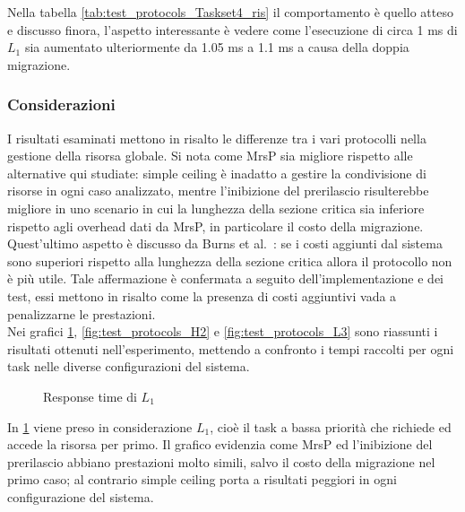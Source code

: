 {\noindent Nella tabella \ref{tab:test_protocols_Taskset4_ris} il comportamento è quello atteso e discusso finora, l'aspetto interessante è vedere come l'esecuzione di circa 1 ms di $L_1$ sia aumentato ulteriormente da 1.05 ms a 1.1 ms a causa della doppia migrazione.

\subsubsection{Considerazioni}
\label{sec:confronto_protocolli_cons}

\noindent I risultati esaminati mettono in risalto le differenze tra i vari protocolli nella gestione della risorsa globale. Si nota come MrsP sia migliore rispetto alle alternative qui studiate: simple ceiling è inadatto a gestire la condivisione di risorse in ogni caso analizzato, mentre l'inibizione del prerilascio risulterebbe migliore in uno scenario in cui la lunghezza della sezione critica sia inferiore rispetto agli overhead dati da MrsP, in particolare il costo della migrazione.\\

\noindent Quest'ultimo aspetto è discusso da Burns et al.~\cite{Burns:2013:SCM:2547348.2547350}: se i costi aggiunti dal sistema sono superiori rispetto alla lunghezza della sezione critica allora il protocollo non è più utile. Tale affermazione è confermata a seguito dell'implementazione e dei test, essi mettono in risalto come la presenza di costi aggiuntivi vada a penalizzarne le prestazioni.\\

\noindent Nei grafici \ref{fig:test_protocols_L1}, \ref{fig:test_protocols_H2} e \ref{fig:test_protocols_L3} sono riassunti i risultati ottenuti nell'esperimento, mettendo a confronto i tempi raccolti per ogni task nelle diverse configurazioni del sistema.\\

\begin{figure}
  \centering
  \confrontoProtocolliLUno
  \caption{Response time di $L_1$}
  \label{fig:test_protocols_L1}
\end{figure}

\noindent In \ref{fig:test_protocols_L1} viene preso in considerazione $L_1$, cioè il task a bassa priorità che richiede ed accede la risorsa per primo. Il grafico evidenzia come MrsP ed l'inibizione del prerilascio abbiano prestazioni molto simili, salvo il costo della migrazione nel primo caso; al contrario simple ceiling porta a risultati peggiori in ogni configurazione del sistema.\\

}
